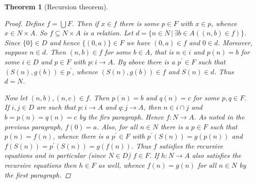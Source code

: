 \documentclass{scrartcl}
\theoremstyle{definition}
\theoremstyle{plain}
\newtheorem{Thm}{Theorem}
\theoremstyle{remark}
\newcommand{\sep}{\,|\,}
\begin{document}
\begin{Thm}[Recursion theorem]
\begin{proof}
    Define $f = \bigcup F$. Then if $x \in f$ there is some $p \in F$ with $x \in p$, whence $x \in N \times A$. So $f \subseteq N \times A$ is a relation. Let $d = \{n \in N \sep \exists b \in A ((n,b) \in f)\}$. Since $\{0\} \in D$ and hence $\{(0,a)\} \in F$ we have $(0,a) \in f$ and $0 \in d$. Moreover, suppose $n \in d$. Then $(n,b) \in f$ for some $b \in A$, that is $n \in i$ and $p(n) = b$ for some $i \in D$ and $p \in F$ with $p : i \longrightarrow A$. By above there is a $p^{\prime} \in F$ such that $(S(n),g(b)) \in p^{\prime}$, whence $(S(n),g(b)) \in f$ and $S(n) \in d$. Thus $d = N$.

    Now let $(n,b),(n,c) \in f$. Then $p(n) = b$ and $q(n) = c$ for some $p,q \in F$. If $i,j \in D$ are such that $p : i \longrightarrow A$ and $q : j \longrightarrow A$, then $n \in i \cap j$ and $b = p(n) = q(n) = c$ by the firs paragraph. Hence $f : N \longrightarrow A$. As noted in the previous paragraph, $f(0) = a$. Also, for all $n \in N$ there is a $p \in F$ such that $p(n) = f(n)$, whence there is a $p^{\prime} \in F$ with $p^{\prime}(S(n)) = g(p(n))$ and $f(S(n)) = p^{\prime}(S(n)) = g(f(n))$. Thus $f$ satisfies the recursive equations and in particular (since $N \in D$) $f \in F$. If $h : N \longrightarrow A$ also satisfies the recursive equations then $h \in F$ as well, whence $f(n) = g(n)$ for all $n \in N$ by the first paragraph.
  \end{proof}
\end{Thm}

\nocite{jech:2002}
\nocite{moschovakis:2006}
\nocite{aczel_rathjen:2001}



\end{document}

